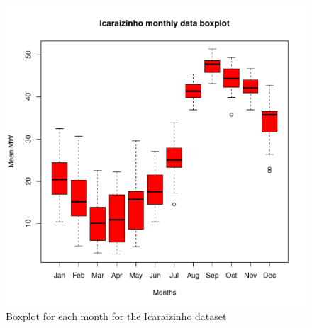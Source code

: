\begin{figure}
\centering
\includegraphics[width=0.8\linewidth]{./Figuras/Icaraizinho/icaraizinho-boxplot}
\caption{Boxplot for each month for the Icaraizinho dataset}
\label{fig:icaraizinho-boxplot}
\end{figure}





